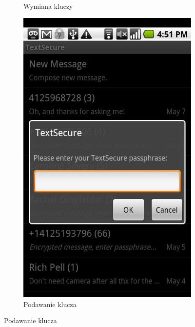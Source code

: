 \documentclass[xcolor=table]{beamer}
\begin{document}
\begin{frame}
\begin{center}
\begin{figure}
\begin{subfigure}[b]{0.4\textwidth}
              \caption{Wymiana kluczy}
            \end{subfigure}
            \quad
             \begin{subfigure}[b]{0.4\textwidth}
              \centering
              \includegraphics[width=\textwidth]{textsecure2}
              \caption{Podawanie klucza}
            \end{subfigure}       
        \end{figure}
      \end{center}
\end{frame}
\end{document}
